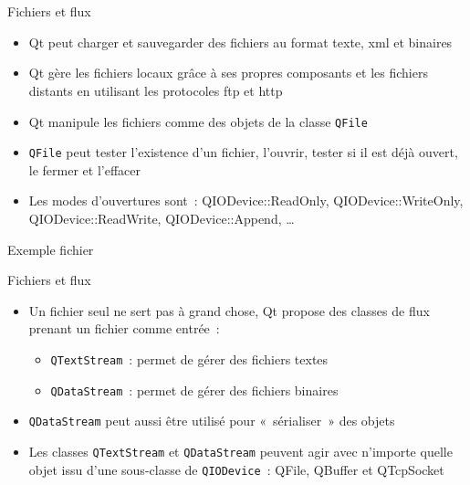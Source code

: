 \documentclass{beamer} %
\begin{document}
\section*{}%
\subsection*{}
\begin{frame}{Fichiers et flux}
	\begin{itemize}
	\item Qt peut charger et sauvegarder des fichiers au format texte, xml et binaires
	\item<2-> Qt gère les fichiers locaux grâce à ses propres composants et les fichiers distants en utilisant les protocoles ftp et http
	\item<3-> Qt manipule les fichiers comme des objets de la classe \texttt{QFile}
	\item<4-> \texttt{QFile} peut tester l'existence d'un fichier, l'ouvrir, tester si il est déjà ouvert, le fermer et l'effacer
	\item<5-> Les modes d'ouvertures sont~: {\ttfamily QIODevice::ReadOnly, QIODevice::WriteOnly, QIODevice::ReadWrite, QIODevice::Append, \ldots}
	\end{itemize}
\end{frame}

\begin{frame}{}

	\begin{exampleblock}{Exemple fichier}
		
	\end{exampleblock}
\end{frame}

\begin{frame}{Fichiers et flux}
	\begin{itemize}
	\item Un fichier seul ne sert pas à grand chose, Qt propose des classes de flux prenant un fichier comme entrée~:
		\begin{itemize}
		\item<2-> \texttt{QTextStream}~: permet de gérer des fichiers textes
		\item<3-> \texttt{QDataStream}~: permet de gérer des fichiers binaires
		\end{itemize}
	\item<4-> \texttt{QDataStream} peut aussi être utilisé pour «~sérialiser~» des objets
	\item<5-> Les classes \texttt{QTextStream} et \texttt{QDataStream} peuvent agir avec n'importe quelle objet issu d'une sous-classe de \texttt{QIODevice}~: {\ttfamily QFile, QBuffer et QTcpSocket}
	\end{itemize}
\end{frame}
\end{document}
